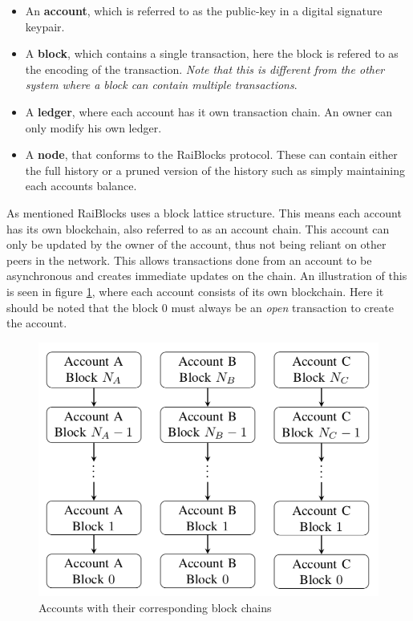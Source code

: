 \begin{itemize}
    \item An \textbf{account}, which is referred to as the public-key in a digital signature keypair.
    \item A \textbf{block}, which contains a single transaction, here the block is refered to as the encoding of the transaction. \emph{Note that this is different from the other system where a block can contain multiple transactions}.
    \item A \textbf{ledger}, where each account has it own transaction chain. An owner can only modify his own ledger. 
    \item A \textbf{node}, that conforms to the RaiBlocks protocol. These can contain either the full history or a pruned version of the history such as simply maintaining each accounts balance.
\end{itemize}

As mentioned RaiBlocks uses a block lattice structure. This means each account has its own blockchain, also referred to as an account chain. This account can only be updated by the owner of the account, thus not being reliant on other peers in the network. This allows transactions done from an account to be asynchronous and creates immediate updates on the chain. An illustration of this is seen in figure \ref{fig:rai-acc-chain}, where each account consists of its own blockchain. Here it should be noted that the block $0$ must always be an \emph{open} transaction to create the account.

\begin{figure}[H]
    \centering
    \includegraphics[scale=0.5]{images/RaiBlock_account_blockchain.png}
    \caption{Accounts with their corresponding block chains}
    \label{fig:rai-acc-chain}
\end{figure}

